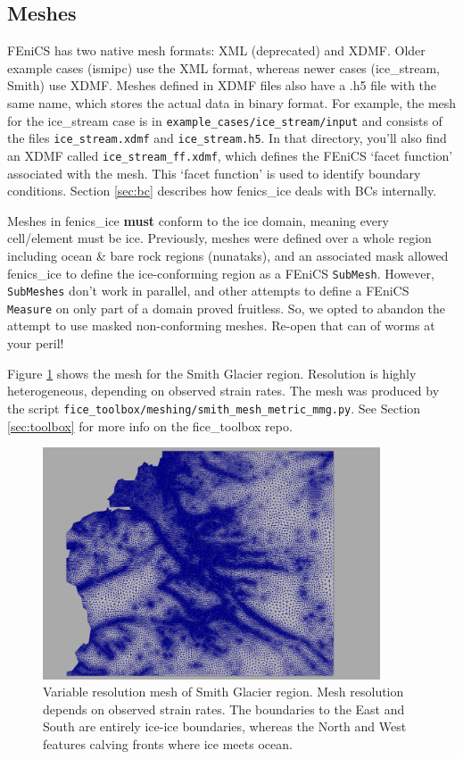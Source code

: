 \documentclass[11pt, reqno, nocenter]{article}
\begin{document}
\subsection{Meshes} \label{sec:mesh}

FEniCS has two native mesh formats: XML (deprecated) and XDMF. Older example cases (ismipc) use the XML format, whereas newer cases (ice\_stream, Smith) use XDMF. Meshes defined in XDMF files also have a .h5 file with the same name, which stores the actual data in binary format. For example, the mesh for the ice\_stream case is in {\tt example\_cases/ice\_stream/input} and consists of the files {\tt ice\_stream.xdmf} and {\tt ice\_stream.h5}. In that directory, you'll also find an XDMF called {\tt ice\_stream\_ff.xdmf}, which defines the FEniCS `facet function' associated with the mesh. This `facet function' is used to identify boundary conditions. Section \ref{sec:bc} describes how fenics\_ice deals with BCs internally.

Meshes in fenics\_ice \textbf{must} conform to the ice domain, meaning every cell/element must be ice. Previously, meshes were defined over a whole region including ocean \& bare rock regions (nunataks), and an associated mask allowed fenics\_ice to define the ice-conforming region as a FEniCS \texttt{SubMesh}. However, {\tt SubMeshes} don't work in parallel, and other attempts to define a FEniCS {\tt Measure} on only part of a domain proved fruitless. So, we opted to abandon the attempt to use masked non-conforming meshes. Re-open that can of worms at your peril!

Figure \ref{fig:smithmesh} shows the mesh for the Smith Glacier region. Resolution is highly heterogeneous, depending on observed strain rates. The mesh was produced by the script {\tt fice\_toolbox/meshing/smith\_mesh\_metric\_mmg.py}. See Section \ref{sec:toolbox} for more info on the fice\_toolbox repo.

\begin{figure}[htbp]
  \centering
  \includegraphics[width=10cm]{./figures/smith_mesh.png}
  \caption[Mesh of Smith Glacier]{Variable resolution mesh of Smith Glacier region. Mesh resolution depends on observed strain rates. The boundaries to the East and South are entirely ice-ice boundaries, whereas the North and West features calving fronts where ice meets ocean.}
      \label{fig:smithmesh}
\end{figure}
\end{document}
